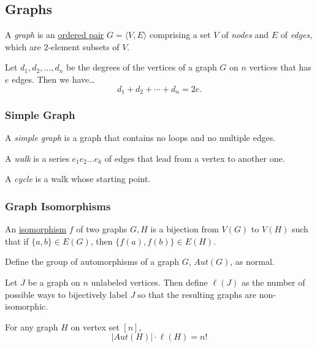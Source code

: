 \subsection{Graphs}\label{graph}

A \emph{graph} is an \hyperref[tuple]{ordered pair} $G = \langle V,E \rangle$ comprising a set $V$ of \emph{nodes} and
$E$ of \emph{edges}, which are $2$-element subsets of $V$.

\begin{proposition}
Let $d_1,d_2,\dots,d_n$ be the degrees of the vertices of a graph $G$ on $n$ vertices that has $e$ edges. Then we have\dots
$$d_1 + d_2 + \cdots + d_n = 2e.$$
\end{proposition}

\subsubsection{Simple Graph}\label{simplegraph}
A \emph{simple graph} is a graph that contains no loops and no multiple edges.

\label{walk}
\noindent A \emph{walk} is a series $e_1e_2\dots e_k$ of edges that lead from a vertex to another one.

\label{cycle}
\noindent A \emph{cycle} is a walk whose starting point.

\subsubsection{Graph Isomorphisms}\label{graphisomorphisms}

An \hyperref[isomorphism]{isomorphism} $f$ of two graphs $G,H$ is a bijection from $V(G)$ to $V(H)$ such that if $\{a,b\} \in E(G)$, then $\{f(a),f(b)\} \in E(H)$.

\label{graphautomorphisms}

Define the group of automorphisms of a graph $G$, $Aut(G)$, as normal.\newline

\noindent Let $J$ be a graph on $n$ unlabeled vertices. Then define $\ell(J)$ as the number of possible ways to bijectively label $J$ so that the resulting graphs are non-isomorphic.

\begin{proposition}
For any graph $H$ on vertex set $[n]$,
$$|Aut(H)|\cdot \ell(H) = n!$$
\end{proposition}

